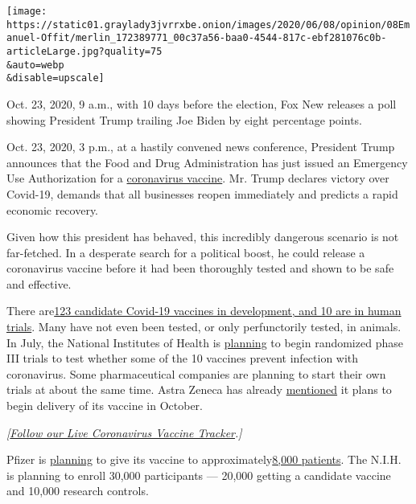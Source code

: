 \texttt{[image: https://static01.graylady3jvrrxbe.onion/images/2020/06/08/opinion/08Emanuel-Offit/merlin\_172389771\_00c37a56-baa0-4544-817c-ebf281076c0b-articleLarge.jpg?quality=75\\\&auto=webp\\\&disable=upscale]}

Oct. 23, 2020, 9 a.m., with 10 days before the election, Fox New
releases a poll showing President Trump trailing Joe Biden by eight
percentage points.

Oct. 23, 2020, 3 p.m., at a hastily convened news conference, President
Trump announces that the Food and Drug Administration has just issued an
Emergency Use Authorization for a
\href{https://www.nytimes3xbfgragh.onion/interactive/2020/06/09/magazine/covid-vaccine.html}{coronavirus
vaccine}. Mr. Trump declares victory over Covid-19, demands that all
businesses reopen immediately and predicts a rapid economic recovery.

Given how this president has behaved, this incredibly dangerous scenario
is not far-fetched. In a desperate search for a political boost, he
could release a coronavirus vaccine before it had been thoroughly tested
and shown to be safe and effective.

There
are\href{https://www.who.int/who-documents-detail/draft-landscape-of-covid-19-candidate-vaccines}{123
candidate Covid-19 vaccines in development, and 10 are in human trials}.
Many have not even been tested, or only perfunctorily tested, in
animals. In July, the National Institutes of Health is
\href{https://www.nbcnews.com/health/health-news/nih-director-large-scale-vaccine-testing-should-be-ready-july-n1207751}{planning}
to begin randomized phase III trials to test whether some of the 10
vaccines prevent infection with coronavirus. Some pharmaceutical
companies are planning to start their own trials at about the same time.
Astra Zeneca has already
\href{https://www.astrazeneca.com/media-centre/press-releases/2020/astrazeneca-advances-response-to-global-covid-19-challenge-as-it-receives-first-commitments-for-oxfords-potential-new-vaccine.html}{mentioned}
it plans to begin delivery of its vaccine in October.

\emph{{[}}\href{https://www.nytimes3xbfgragh.onion/interactive/2020/science/coronavirus-vaccine-tracker.html}{\emph{Follow
our Live Coronavirus Vaccine Tracker}}\emph{.{]}}

Pfizer is
\href{https://www.cnbc.com/2020/05/05/pfizer-biontech-are-set-to-begin-us-coronavirus-vaccine-trial.html}{planning}
to give its vaccine to
approximately\href{https://www.cnbc.com/2020/05/05/pfizer-biontech-are-set-to-begin-us-coronavirus-vaccine-trial.html}{8,000
patients}. The N.I.H. is planning to enroll 30,000 participants ---
20,000 getting a candidate vaccine and 10,000 research controls.

